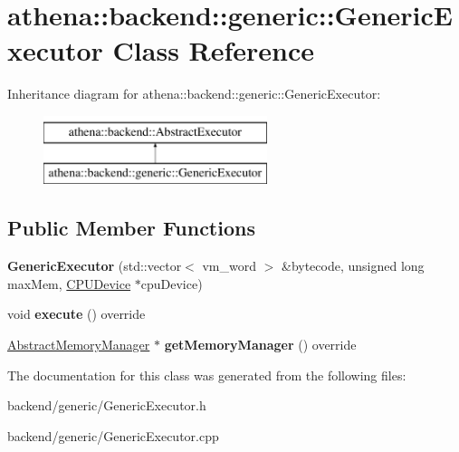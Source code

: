\hypertarget{classathena_1_1backend_1_1generic_1_1_generic_executor}{}\section{athena\+:\+:backend\+:\+:generic\+:\+:Generic\+Executor Class Reference}
\label{classathena_1_1backend_1_1generic_1_1_generic_executor}
Inheritance diagram for athena\+:\+:backend\+:\+:generic\+:\+:Generic\+Executor\+:\begin{figure}[H]
\begin{center}
\leavevmode
\includegraphics[height=2.000000cm]{classathena_1_1backend_1_1generic_1_1_generic_executor}
\end{center}
\end{figure}
\subsection*{Public Member Functions}
\begin{DoxyCompactItemize}
\item 
\mbox{\label{classathena_1_1backend_1_1generic_1_1_generic_executor_a150867180e469045e4dc9cbbce8e2774}} 
{\bfseries Generic\+Executor} (std\+::vector$<$ vm\+\_\+word $>$ \&bytecode, unsigned long max\+Mem, \mbox{\hyperlink{classathena_1_1backend_1_1generic_1_1_c_p_u_device}{C\+P\+U\+Device}} $\ast$cpu\+Device)
\item 
\mbox{\label{classathena_1_1backend_1_1generic_1_1_generic_executor_a38b56c284050d31198b28fcb6595bc73}} 
void {\bfseries execute} () override
\item 
\mbox{\label{classathena_1_1backend_1_1generic_1_1_generic_executor_a0560a1dfc0c70ebef0b5be26bb82b9c5}} 
\mbox{\hyperlink{classathena_1_1backend_1_1_abstract_memory_manager}{Abstract\+Memory\+Manager}} $\ast$ {\bfseries get\+Memory\+Manager} () override
\end{DoxyCompactItemize}


The documentation for this class was generated from the following files\+:\begin{DoxyCompactItemize}
\item 
backend/generic/Generic\+Executor.\+h\item 
backend/generic/Generic\+Executor.\+cpp\end{DoxyCompactItemize}
